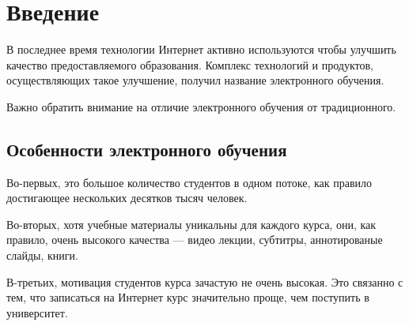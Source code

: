 \documentclass{matmex-diploma-custom}
\begin{document}
\maketitle
\tableofcontents
\section*{Введение}

В последнее время технологии Интернет активно используются чтобы
улучшить качество предоставляемого образования. Комплекс технологий и
продуктов, осуществляющих такое улучшение, получил название
электронного обучения.

Важно обратить внимание на отличие электронного обучения от
традиционного.

\subsection*{Особенности электронного обучения}

Во-первых, это большое количество студентов в одном потоке, как
правило достигающее нескольких десятков тысяч человек\cite{breslow2013studying}.

Во-вторых, хотя учебные материалы уникальны для каждого курса, они,
как правило, очень высокого качества --- видео лекции, субтитры,
аннотированые слайды, книги.

В-третьих, мотивация студентов курса зачастую не очень высокая. Это
связанно с тем, что записаться на Интернет курс значительно проще, чем
поступить в университет\cite{Clow}.
\end{document}
